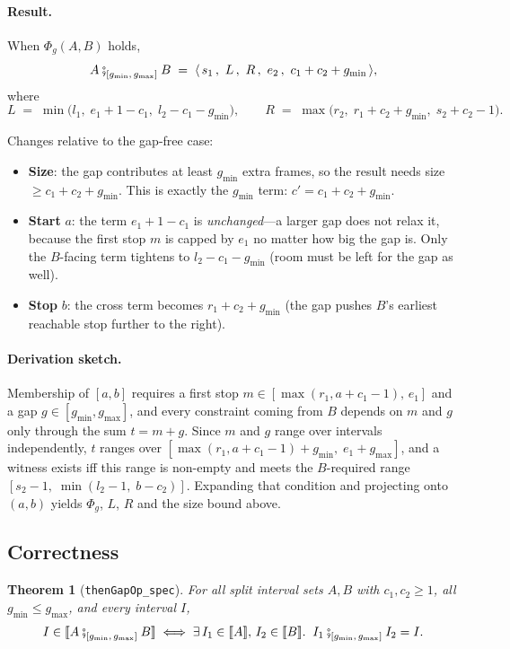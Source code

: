 \documentclass[11pt]{article}
\newcommand{\sem}[1]{\llbracket #1 \rrbracket}      %
\newcommand{\ThenG}[2]{\mathbin{\fatsemi}_{[#1,\,#2]}} %
\newcommand{\R}[5]{\langle #1,\, #2,\, #3,\, #4,\, #5 \rangle} %
\newcommand{\gmin}{g_{\min}}
\newcommand{\gmax}{g_{\max}}
\theoremstyle{definition}
\theoremstyle{plain}
\newtheorem{theorem}{Theorem}
\begin{document}
\paragraph{Result.}
When $\Phi_g(A,B)$ holds,
\[
  A \ThenG{\gmin}{\gmax} B \;=\;
  \R{\,s_1\,}{\,L\,}{\,R\,}{\,e_2\,}{\,c_1 + c_2 + \gmin\,},
\]
where
\[
  L \;=\; \min\!\bigl(l_1,\; e_1 + 1 - c_1,\; l_2 - c_1 - \gmin\bigr),
  \qquad
  R \;=\; \max\!\bigl(r_2,\; r_1 + c_2 + \gmin,\; s_2 + c_2 - 1\bigr).
\]

\noindent
Changes relative to the gap-free case:
\begin{itemize}
  \item \textbf{Size}: the gap contributes at least $\gmin$ extra frames, so the
        result needs size $\ge c_1 + c_2 + \gmin$. This is exactly the
        $g_{\min}$ term: $c' = c_1 + c_2 + \gmin$.
  \item \textbf{Start} $a$: the term $e_1 + 1 - c_1$ is \emph{unchanged}---a
        larger gap does not relax it, because the first stop $m$ is capped by
        $e_1$ no matter how big the gap is. Only the $B$-facing term tightens to
        $l_2 - c_1 - \gmin$ (room must be left for the gap as well).
  \item \textbf{Stop} $b$: the cross term becomes $r_1 + c_2 + \gmin$ (the gap
        pushes $B$'s earliest reachable stop further to the right).
\end{itemize}

\paragraph{Derivation sketch.}
Membership of $[a,b]$ requires a first stop $m \in [\max(r_1, a + c_1 - 1),\,
e_1]$ and a gap $g \in [\gmin, \gmax]$, and every constraint coming from $B$
depends on $m$ and $g$ only through the sum $t = m + g$. Since $m$ and $g$ range
over intervals independently, $t$ ranges over
$[\max(r_1, a{+}c_1{-}1) + \gmin,\; e_1 + \gmax]$, and a witness exists iff this
range is non-empty and meets the $B$-required range
$[s_2 - 1,\; \min(l_2 - 1,\; b - c_2)]$. Expanding that condition and projecting
onto $(a,b)$ yields $\Phi_g$, $L$, $R$ and the size bound above.

\subsection{Correctness}

\begin{theorem}[\texttt{thenGapOp\_spec}]
For all split interval sets $A, B$ with $c_1, c_2 \ge 1$, all $\gmin \le \gmax$,
and every interval $I$,
\[
  I \in \sem{A \ThenG{\gmin}{\gmax} B}
  \;\Longleftrightarrow\;
  \exists\, I_1 \in \sem{A},\, I_2 \in \sem{B}.\;\;
  I_1 \ThenG{\gmin}{\gmax} I_2 = I.
\]
\end{theorem}
\end{document}
